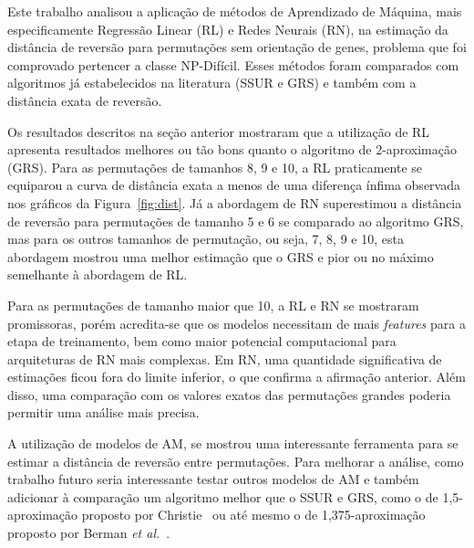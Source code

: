 \documentclass[runningheads,a4paper]{llncs}
\begin{document}
Este trabalho analisou a aplicação de métodos de Aprendizado de Máquina, mais especificamente Regressão Linear (RL) e Redes Neurais (RN), na estimação da distância de reversão para permutações sem orientação de genes, problema que foi comprovado pertencer a classe NP-Difícil. Esses métodos foram comparados com algoritmos já estabelecidos na literatura (SSUR e GRS) e também com a distância exata de reversão.

Os resultados descritos na seção anterior mostraram que a utilização de RL apresenta resultados melhores ou tão bons quanto o algoritmo de 2-aproximação (GRS). Para as permutações de tamanhos 8, 9 e 10, a RL praticamente se equiparou a curva de distância exata a menos de uma diferença ínfima observada nos gráficos da Figura~\ref{fig:dist}. Já a abordagem de RN superestimou a distância de reversão para permutações de tamanho 5 e 6 se comparado ao algoritmo GRS, mas para os outros tamanhos de permutação, ou seja, 7, 8, 9 e 10, esta abordagem mostrou uma melhor estimação que o GRS e pior ou no máximo semelhante à abordagem de RL.

Para as permutações de tamanho maior que 10, a RL e RN se mostraram promissoras, porém acredita-se que os modelos necessitam de mais \textit{features} para a etapa de treinamento, bem como maior potencial computacional para arquiteturas de RN mais complexas. Em RN, uma quantidade significativa de estimações ficou fora do limite inferior, o que confirma a afirmação anterior. Além disso, uma comparação com os valores exatos das permutações grandes poderia permitir uma análise mais precisa.

A utilização de modelos de AM, se mostrou uma interessante ferramenta para se estimar a distância de reversão entre permutações. Para melhorar a análise, como trabalho futuro seria interessante testar outros modelos de AM e também adicionar à comparação um algoritmo melhor que o SSUR e GRS, como o de 1,5-aproximação proposto por Christie~\cite{Christie} ou até mesmo o de 1,375-aproximação proposto por Berman \textit{et al.}~\cite{Berman}.



\end{document}
